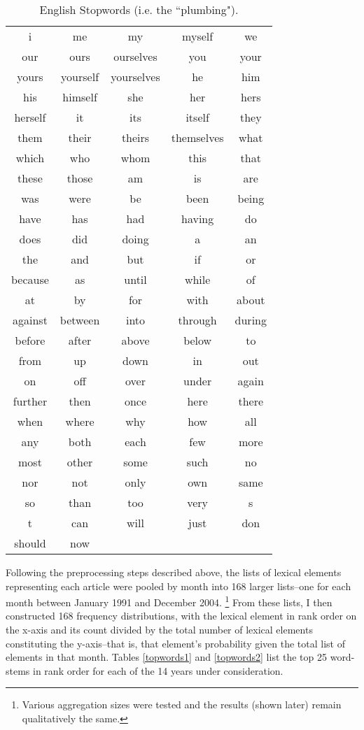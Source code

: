 \begin{table}
\begin{center}
\caption[English Stopwords]{English Stopwords (i.e. the ``plumbing"). \label{stop}}
\vspace{0.3in}
\begin{tabular}{ccccc}
\hline 
\hline
i & me & my & myself & we \\
our & ours & ourselves & you & your \\
yours & yourself & yourselves & he & him \\
his & himself & she & her & hers\\
herself & it & its & itself & they\\
them & their & theirs & themselves & what \\
which & who & whom & this & that \\
these & those & am & is & are\\
was & were & be & been & being \\
have & has & had & having & do\\
does & did & doing & a & an \\
the & and & but & if & or \\
because & as & until & while & of \\
at & by & for & with & about \\
against & between & into & through & during \\
before & after & above & below & to \\
from & up & down & in & out \\
on & off & over & under & again \\
further & then & once & here & there \\
when & where & why & how & all \\
any & both & each & few & more \\
most & other & some & such & no \\
nor & not & only & own & same \\
so & than & too & very & s \\
t & can & will & just & don \\
should & now & & & \\
\hline
\end{tabular}
\end{center}
\end{table}

Following the preprocessing steps described above, the lists of lexical elements representing each article were pooled by month into 168 larger lists--one for each month between January 1991 and December 2004. \footnote{Various aggregation sizes were tested and the results (shown later) remain qualitatively the same.} From these lists, I then constructed 168 frequency distributions, with the lexical element in rank order on the x-axis and its count divided by the total number of lexical elements constituting the y-axis--that is, that element's probability given the total list of elements in that month. Tables \ref{topwords1} and \ref{topwords2} list the top 25 word-stems in rank order for each of the 14 years under consideration. 

